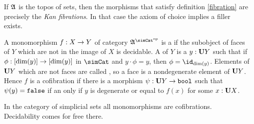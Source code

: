 \documentclass[csh.tex]{subfiles}
\begin{document}

\begin{example} If $\mathfrak A$ is the topos of sets, then the morphisms that satisfy definition \ref{fibration} are precisely the \emph{Kan fibrations}. In that case the axiom of choice implies a filler exists. \end{example}

\begin{definition} A monomorphism $f: X\to Y$ of category $\ambient\s$ is a  if the subobject of faces of $Y$ which are not in the image of $X$ is decidable. A  of $Y$ is a $y:\mathbf{U} Y$ such that if $\phi: [\dim(y)]\to [\dim(y)]$ in $\simCat$ and $y\cdot \phi = y$, then $\phi = \id_{\dim(y)}$. Elements of $\mathbf{U} Y$ which are not faces are called , so a face is a nondegenerate element of $\mathbf{U} Y$. Hence $f$ is a cofibration if there is a morphism $\psi:\mathbf{U} Y\to\mathtt{bool}$ such that $\psi(y)=\mathtt{false}$ if an only if $y$ is degenerate or equal to $f(x)$ for some $x: \mathbf{U} X$.\end{definition}

\begin{example} In the category of simplicial sets all monomorphisms are cofibrations. Decidability comes for free there.\end{example}
\end{document}
